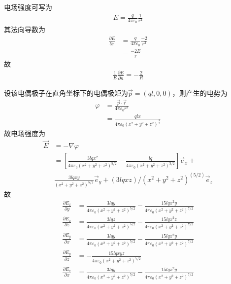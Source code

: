 \documentclass{phyasgn}
\begin{document}
\begin{sol}[1]
  电场强度可写为
    \begin{align*}
      E=\frac{q}{4\pi\varepsilon_0}\frac{1}{r^2}
    \end{align*}
  其法向导数为
  \begin{align*}
    \frac{\partial E}{\partial r}&=\frac{q}{4\pi\varepsilon_0}\frac{-2}{r^3}\\
    &=\frac{-2E}{r}
  \end{align*}
  故
  \begin{align*}
    \frac{1}{E}\frac{\partial E}{\partial n}=-\frac{2}{R}
  \end{align*}
\end{sol}\par

\begin{sol}[2]
  设该电偶极子在直角坐标下的电偶极矩为$\vec{p}=(ql,0,0)$，则产生的电势为
  \begin{align*}
    \varphi&=\frac{\vec{p}\cdot \vec{r}}{4\pi\varepsilon_0 r^3}\\
    &=\frac{qlx}{4\pi\varepsilon_0(x^2+y^2+z^2)^{\frac{3}{2}}}
  \end{align*}
  故电场强度为
  \begin{align*}
    \vec{E}&=-\nabla\varphi\\
    &=[\frac{3 l q x^2}{4\pi\varepsilon_0\left(x^2+y^2+z^2\right)^{5/2}}-\frac{l q}{4\pi\varepsilon_0\left(x^2+y^2+z^2\right)^{3/2}}]\vec{e}_x+\\
    &\frac{3 l q x y}{\left(x^2+y^2+z^2\right)^{5/2}}\vec{e}_y+(3 l q x z)/(x^2 + y^2 + z^2)^(5/2)\vec{e}_z
  \end{align*}
  故
  \begin{align*}
    \frac{\partial E_x}{\partial y}&=\frac{3 l q y}{4\pi\varepsilon_0\left(x^2+y^2+z^2\right)^{5/2}}-\frac{15 l q x^2 y}{4\pi\varepsilon_0\left(x^2+y^2+z^2\right)^{7/2}}\\
    \frac{\partial E_x}{\partial z}&=\frac{3 l q z}{4\pi\varepsilon_0\left(x^2+y^2+z^2\right)^{5/2}}-\frac{15 l q x^2 z}{4\pi\varepsilon_0\left(x^2+y^2+z^2\right)^{7/2}}\\
    \frac{\partial E_y}{\partial x}&=\frac{3 l q y}{4\pi\varepsilon_0\left(x^2+y^2+z^2\right)^{5/2}}-\frac{15 l q x^2 y}{4\pi\varepsilon_0\left(x^2+y^2+z^2\right)^{7/2}}\\
    \frac{\partial E_y}{\partial z}&=-\frac{15 l q x y z}{4\pi\varepsilon_0\left(x^2+y^2+z^2\right)^{7/2}}\\
    \frac{\partial E_z}{\partial x}&=\frac{3 l q y}{4\pi\varepsilon_0\left(x^2+y^2+z^2\right)^{5/2}}-\frac{15 l q x^2 y}{4\pi\varepsilon_0\left(x^2+y^2+z^2\right)^{7/2}}\\

\end{align*}
\end{sol}
\end{document}
